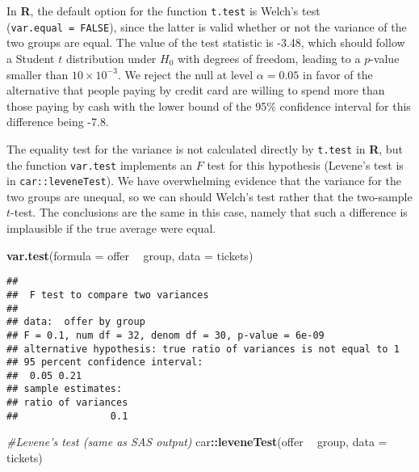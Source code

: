 \documentclass[
]{book}
\newenvironment{Shaded}{\begin{snugshade}}{\end{snugshade}}
\newcommand{\CommentTok}[1]{\textcolor[rgb]{0.56,0.35,0.01}{\textit{#1}}}
\newcommand{\DataTypeTok}[1]{\textcolor[rgb]{0.13,0.29,0.53}{#1}}
\newcommand{\KeywordTok}[1]{\textcolor[rgb]{0.13,0.29,0.53}{\textbf{#1}}}
\newcommand{\NormalTok}[1]{#1}
\newcommand{\OperatorTok}[1]{\textcolor[rgb]{0.81,0.36,0.00}{\textbf{#1}}}
\newcommand{\StringTok}[1]{\textcolor[rgb]{0.31,0.60,0.02}{#1}}
\begin{document}
In \textbf{R}, the default option for the function \texttt{t.test} is Welch's test (\texttt{var.equal\ =\ FALSE}), since the latter is valid whether or not the variance of the two groups are equal. The value of the test statistic is -3.48, which should follow a Student \(t\) distribution under \(H_0\) with degrees of freedom, leading to a \(p\)-value smaller than \(10 \times 10^{-3}\). We reject the null at level \(\alpha=0.05\) in favor of the alternative that people paying by credit card are willing to spend more than those paying by cash with the lower bound of the 95\% confidence interval for this difference being -7.8.

The equality test for the variance is not calculated directly by \texttt{t.test} in \textbf{R}, but the function \texttt{var.test} implements an \(F\) test for this hypothesis (Levene's test is in \texttt{car::leveneTest}). We have overwhelming evidence that the variance for the two groups are unequal, so we can should Welch's test rather that the two-sample \(t\)-test. The conclusions are the same in this case, namely that such a difference is implausible if the true average were equal.

\begin{Shaded}
\begin{Highlighting}[]
\KeywordTok{var.test}\NormalTok{(}\DataTypeTok{formula =}\NormalTok{ offer }\OperatorTok{~}\StringTok{ }\NormalTok{group, }
       \DataTypeTok{data =}\NormalTok{ tickets)}
\end{Highlighting}
\end{Shaded}

\begin{verbatim}
## 
##  F test to compare two variances
## 
## data:  offer by group
## F = 0.1, num df = 32, denom df = 30, p-value = 6e-09
## alternative hypothesis: true ratio of variances is not equal to 1
## 95 percent confidence interval:
##  0.05 0.21
## sample estimates:
## ratio of variances 
##                0.1
\end{verbatim}

\begin{Shaded}
\begin{Highlighting}[]
\CommentTok{#Levene's test (same as SAS output)}
\NormalTok{car}\OperatorTok{::}\KeywordTok{leveneTest}\NormalTok{(offer }\OperatorTok{~}\StringTok{ }\NormalTok{group, }
       \DataTypeTok{data =}\NormalTok{ tickets)}
\end{Highlighting}
\end{Shaded}
\end{document}
